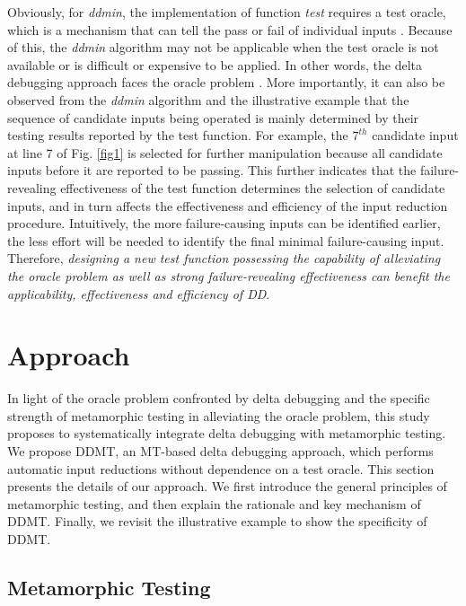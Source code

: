  


Obviously, for \emph{ddmin}, the implementation of function \emph{test} requires a test oracle, which is a mechanism that can tell the pass or fail of individual inputs \cite{Barr2015}. 
Because of this,  the \emph{ddmin} algorithm may not be applicable when the test oracle is not available or is difficult or expensive to be applied.
In other words, the delta debugging approach faces the oracle problem \cite{zeller2025simplifying}.
More importantly, it can also be observed from the \emph{ddmin} algorithm and the illustrative example that the sequence of candidate inputs being operated is mainly determined by their testing results reported by the test function.
For example, the $7^{th}$ candidate input at line 7 of Fig. \ref{fig1} is selected for further manipulation because all candidate inputs before it are reported to be passing.
This further indicates that the failure-revealing effectiveness of the test function determines the selection of candidate inputs, and in turn affects the effectiveness and efficiency of the input reduction procedure.
Intuitively, the more failure-causing inputs can be identified earlier, the less effort will be needed to identify the final minimal failure-causing input.
Therefore, \emph{designing a new test function possessing the capability of alleviating the oracle problem as well as strong failure-revealing effectiveness can benefit the applicability, effectiveness and efficiency of DD}.

\section{Approach}
\label{sec:app}

In light of the oracle problem confronted by delta debugging and the specific strength of metamorphic testing in alleviating the oracle problem, this study proposes to systematically integrate delta debugging with metamorphic testing.
We propose DDMT, an MT-based delta debugging approach, which performs automatic input reductions without dependence on a test oracle.
This section presents the details of our approach.
We first introduce the general principles of metamorphic testing, and then explain the rationale and key mechanism of DDMT.
Finally, we revisit the illustrative example to show the specificity of DDMT.

\subsection{Metamorphic Testing}
\label{MT}



